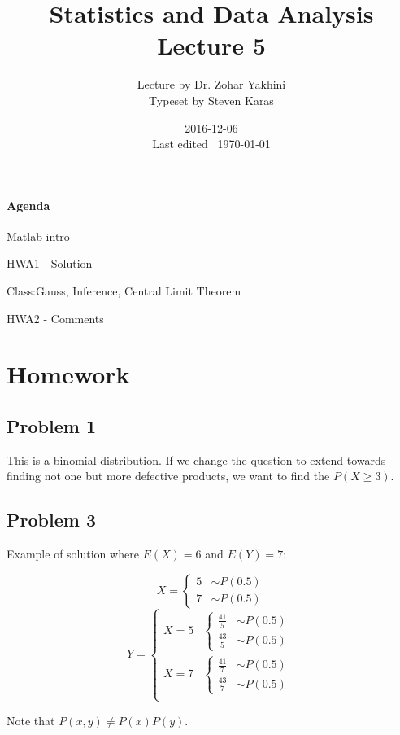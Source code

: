 \documentclass[a4paper]{article}
\title{Statistics and Data Analysis\\\large Lecture 5}
\date{2016-12-06 \\ Last edited \currenttime\ \today}
\author{Lecture by Dr. Zohar Yakhini\\Typeset by Steven Karas}
\newenvironment{itemize*}%
  {\begin{itemize}%
    \setlength{\itemsep}{0pt}%
    \setlength{\parsep}{0pt}%
    \setlength{\parskip}{0pt}}%
  {\end{itemize}}
\begin{document}
\maketitle

\paragraph{Agenda}
\begin{itemize*}
  \item Matlab intro
  \item HWA1 - Solution
  \item Class:Gauss, Inference, Central Limit Theorem
  \item HWA2 - Comments
\end{itemize*}

\section{Homework}

\subsection{Problem 1}
This is a binomial distribution. If we change the question to extend towards finding not one but more defective products, we want to find the $P(X\ge 3)$.

\subsection{Problem 3}
Example of solution where $E(X)=6$ and $E(Y)=7$:

\[X=\begin{cases}5 & \sim P(0.5) \\ 7 & \sim P(0.5)\end{cases}\]
\[Y=
\begin{cases}
  X=5 &
  \begin{cases}
    \frac{41}{5} & \sim P(0.5) \\
    \frac{43}{5} & \sim P(0.5)
  \end{cases}\\
  X=7 &
  \begin{cases}
    \frac{41}{7} & \sim P(0.5) \\
    \frac{43}{7} & \sim P(0.5)
  \end{cases}\\
\end{cases}
\]

Note that $P(x,y)\ne P(x)P(y)$.
\end{document}

